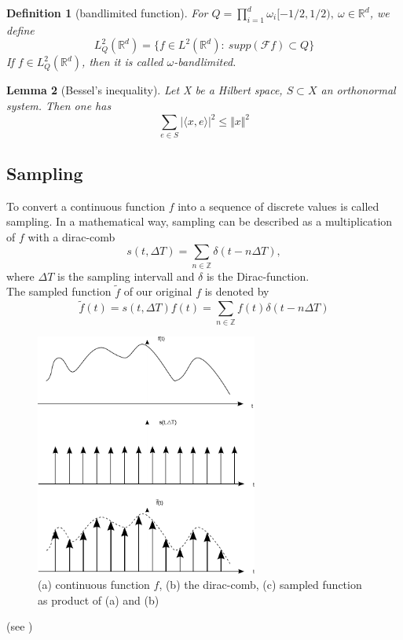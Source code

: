 \documentclass[a4paper, 11pt]{scrreprt}
\newtheorem{defi}{Definition}[section]
\newtheorem{lemma}[defi]{Lemma}
\newcommand{\RR}{\mathbb{R}}
\newcommand{\ZZ}{\mathbb{Z}}
\newcommand{\FF}{\mathcal{F}}
\begin{document}
\begin{defi}[bandlimited function]
	For \(Q = \prod_{i=1}^d \omega_i[-1/2, 1/2),\ \omega\in\RR^d\), we define
	\begin{equation}
		L_Q^2(\RR^d) = \{f\in L^2(\RR^d):\ supp(\FF f) \subset Q\}
	\end{equation}
	If \(f\in L_Q^2(\RR^d)\), then it is called \(\omega\)-bandlimited.
\end{defi}

\begin{lemma}[Bessel's inequality]
Let X be a Hilbert space, $S \subset X$ an orthonormal system. Then one has
\[\sum_{e \in S} |\langle x, e \rangle |^2 \leq \Vert x \Vert ^2\]
\end{lemma}


\subsection{Sampling}
To convert a continuous function \(f\) into a sequence of discrete values is called sampling. In a mathematical way, sampling can be described as a multiplication of \(f\) with a dirac-comb 
\[s(t,\Delta T) = \sum_{n\in\ZZ} \delta(t-n\Delta T), \]
where \(\Delta T\) is the sampling intervall and \(\delta\) is the Dirac-function.\\
The sampled function \(\tilde{f}\) of our original \(f\) is denoted by
\begin{equation}
	\tilde{f} (t) = s(t,\Delta T) f(t) = \sum_{n\in\ZZ} f(t)\delta(t-n\Delta T)
\end{equation}
\begin{figure}[htpb]
	\centering
	\includegraphics[width=0.65\textwidth]{Sampling-Visualisierung.pdf}
	\caption{(a) continuous function \(f\), (b) the dirac-comb, (c) sampled function as product of (a) and (b)}
\end{figure}
(see \cite{marks02})
\end{document}
